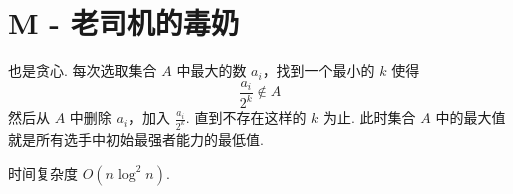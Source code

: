 \documentclass{ctexart}
\begin{document}
\section*{M - 老司机的毒奶}

也是贪心. 每次选取集合 $A$ 中最大的数 $a_i$，找到一个最小的 $k$ 使得
\[
    \frac{a_i}{2^k} \notin A
\]
然后从 $A$ 中删除 $a_i$，加入 $\frac{a_i}{2^k}$.
直到不存在这样的 $k$ 为止.
此时集合 $A$ 中的最大值就是所有选手中初始最强者能力的最低值.

时间复杂度 $O(n\log^2{n})$.
\end{document}
